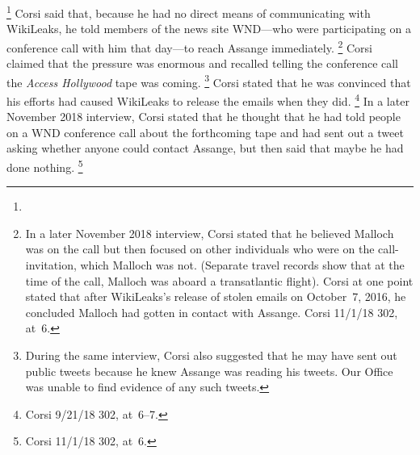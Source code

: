 \footnote{}
Corsi said that, because he had no direct means of communicating with WikiLeaks, he told members of the news site WND---who were participating on a conference call with him that day---to reach Assange immediately.%
\footnote{In a later November 2018 interview, Corsi stated  that he believed Malloch was on the call but then focused on other individuals who were on the call-invitation, which Malloch was not.
(Separate travel records show that at the time of the call, Malloch was aboard a transatlantic flight).
Corsi at one point stated that after WikiLeaks's release of stolen emails on October~7, 2016, he concluded Malloch had gotten in contact with Assange.
Corsi 11/1/18 302, at~6.}
Corsi claimed that the pressure was enormous and recalled telling the conference call the \textit{Access Hollywood} tape was coming.%
\footnote{During the same interview, Corsi also suggested that he may have sent out public tweets because he knew Assange was reading his tweets.
Our Office was unable to find evidence of any such tweets.}
Corsi stated that he was convinced that his efforts had caused WikiLeaks to release the emails when they did.%
\footnote{Corsi 9/21/18 302, at~6--7.}
In a later November 2018 interview, Corsi stated that he thought that he had told people on a WND conference call about the forthcoming tape and had sent out a tweet asking whether anyone could contact Assange, but then said that maybe he had done nothing.%
\footnote{Corsi 11/1/18 302, at~6.}

